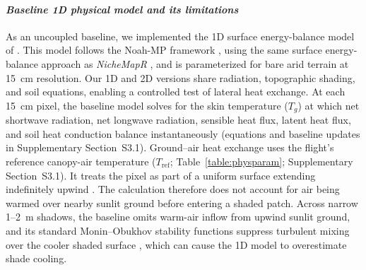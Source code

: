 \documentclass[12pt]{article}
\begin{document}
\paragraph*{\textit{Baseline 1D physical model and its limitations}}
As an uncoupled baseline, we implemented the 1D surface energy-balance model of \citet{Itzkovitch2025}. This model follows the Noah-MP framework \citep{niu_2011}, using the same surface energy-balance approach as \textit{NicheMapR} \citep{kearney_2017}, and is parameterized for bare arid terrain at 15~cm resolution. Our 1D and 2D versions share radiation, topographic shading, and soil equations, enabling a controlled test of lateral heat exchange. At each 15~cm pixel, the baseline model solves for the skin temperature ($T_g$) at which net shortwave radiation, net longwave radiation, sensible heat flux, latent heat flux, and soil heat conduction balance instantaneously \citep{campbell_1998} (equations and baseline updates in Supplementary Section~S3.1). Ground--air heat exchange uses the flight's reference canopy-air temperature ($T_\text{ref}$; Table~\ref{table:physparam}; Supplementary Section~S3.1). It treats the pixel as part of a uniform surface extending indefinitely upwind \citep{brutsaert_1982}. The calculation therefore does not account for air being warmed over nearby sunlit ground before entering a shaded patch. Across narrow 1--2~m shadows, the baseline omits warm-air inflow from upwind sunlit ground, and its standard Monin--Obukhov stability functions suppress turbulent mixing over the cooler shaded surface \citep{brutsaert_1982}, which can cause the 1D model to overestimate shade cooling.
\end{document}
